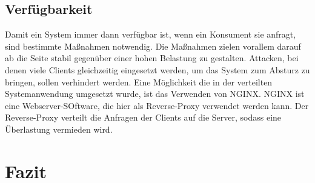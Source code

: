 \documentclass[utf8,biblatex]{lni}
\begin{document}
\subsection{Verfügbarkeit}

Damit ein System immer dann verfügbar ist, wenn ein Konsument sie anfragt, sind bestimmte Maßnahmen notwendig. Die Maßnahmen zielen vorallem
darauf ab die Seite stabil gegenüber einer hohen Belastung zu gestalten. Attacken, bei denen viele Clients gleichzeitig eingesetzt werden, um das System 
zum Absturz zu bringen, sollen verhindert werden. Eine Möglichkeit die in der verteilten Systemanwendung umgesetzt wurde, ist das Verwenden von NGINX.
NGINX ist eine Webserver-SOftware, die hier als Reverse-Proxy verwendet werden kann. Der Reverse-Proxy verteilt die Anfragen der Clients auf die Server, sodass
eine Überlastung vermieden wird.


\section{Fazit}



\printbibliography
\end{document}
